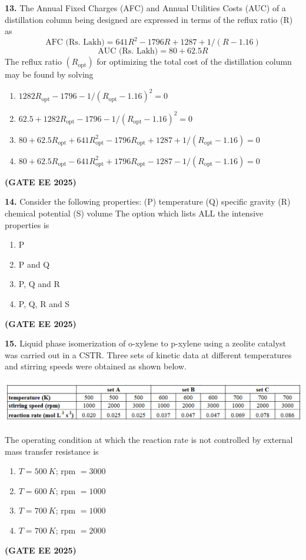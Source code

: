 \documentclass[journal,12pt,onecolumn]{IEEEtran}
\newcommand{\brak}[1]{(#1)}
\begin{document}
\noindent\textbf{13.} The Annual Fixed Charges \brak{AFC} and Annual Utilities Costs \brak{AUC} of a distillation column being designed are expressed in terms of the reflux ratio \brak{R} as
\[ \text{AFC \brak{Rs. Lakh}} = 641 R^{2}-1796 R+1287+1/\brak{R-1.16} \]
\[ \text{AUC \brak{Rs. Lakh}} = 80+62.5 R \]
The reflux ratio $\brak{R_{\text{opt}}}$ for optimizing the total cost of the distillation column may be found by solving
\begin{enumerate}
    \item $1282 R_{\text{opt}}-1796-1/\brak{R_{\text{opt}}-1.16}^{2}=0$
    \item $62.5+1282 R_{\text{opt}}-1796-1/\brak{R_{\text{opt}}-1.16}^{2}=0$
    \item $80+62.5 R_{\text{opt}}+641 R_{\text{opt}}^{2}-1796 R_{\text{opt}}+1287+1/\brak{R_{\text{opt}}-1.16}=0$
    \item $80+62.5 R_{\text{opt}}-641 R_{\text{opt}}^{2}+1796 R_{\text{opt}}-1287-1/\brak{R_{\text{opt}}-1.16}=0$
\end{enumerate}
\hfill \textbf{\brak{GATE EE 2025}}

\noindent\textbf{14.} Consider the following properties:
\brak{P} temperature
\brak{Q} specific gravity
\brak{R} chemical potential
\brak{S} volume
The option which lists ALL the intensive properties is
\begin{enumerate}
    \item P
    \item P and Q
    \item P, Q and R
    \item P, Q, R and S
\end{enumerate}
\hfill \textbf{\brak{GATE EE 2025}}

\noindent\textbf{15.} Liquid phase isomerization of o-xylene to p-xylene using a zeolite catalyst was carried out in a CSTR. Three sets of kinetic data at different temperatures and stirring speeds were obtained as shown below.
\begin{center}
\includegraphics[width=1\textwidth]{figs/16.png}
\end{center}
The operating condition at which the reaction rate is not controlled by external mass transfer resistance is
\begin{enumerate}
    \item $T=500~K$; rpm $=3000$
    \item $T=600~K$; rpm $=1000$
    \item $T=700~K$; rpm $=1000$
    \item $T=700~K$; rpm $=2000$
\end{enumerate}
\hfill \textbf{\brak{GATE EE 2025}}
\end{document}
